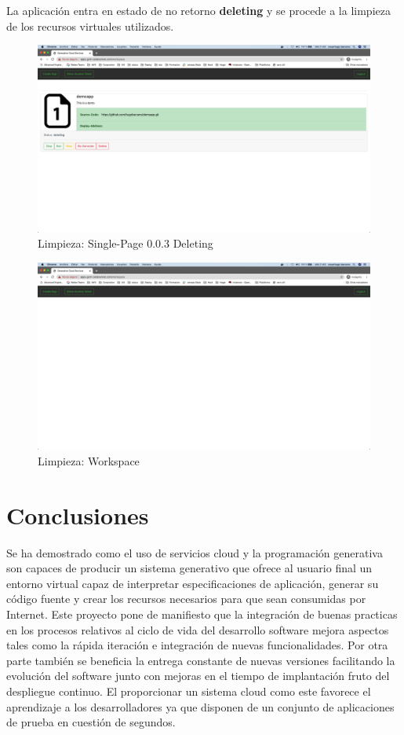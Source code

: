 \documentclass[a4paper,11pt]{book}
\begin{document}
La aplicación entra en estado de no retorno \textbf{deleting} y se procede  a la limpieza de los recursos virtuales utilizados. 

   \begin{figure}[H]
\centering
\includegraphics[scale=0.2]{imagenes/casouso/5_2.png}
\caption{  Limpieza: Single-Page 0.0.3 Deleting }
\end{figure}

   \begin{figure}[H]
\centering
\includegraphics[scale=0.2]{imagenes/casouso/5_3.png}
\caption{ Limpieza: Workspace  }
\end{figure}


\chapter{Conclusiones}

Se ha demostrado como el uso de servicios cloud y la programación generativa son capaces de producir un sistema generativo que ofrece al usuario final un entorno virtual capaz de interpretar especificaciones de aplicación, generar su código fuente y crear los recursos necesarios para que sean consumidas por Internet.   Este proyecto pone de manifiesto que la integración de buenas practicas en los procesos relativos al ciclo de vida del desarrollo software mejora aspectos tales como la rápida iteración e integración  de nuevas funcionalidades. Por otra parte también se beneficia la entrega constante de nuevas versiones facilitando la evolución del software junto con mejoras en el tiempo de implantación fruto del despliegue continuo. El proporcionar un sistema cloud como este favorece el aprendizaje a los desarrolladores ya que disponen de un conjunto de aplicaciones de prueba en cuestión de segundos.  
\end{document}
